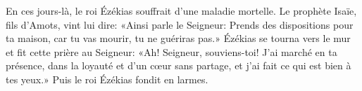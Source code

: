En ces jours-là, le roi Ézékias souffrait d’une maladie mortelle.
Le prophète Isaïe, fils d’Amots, vint lui dire:
	«Ainsi parle le Seigneur: Prends des dispositions pour ta maison,
	car tu vas mourir, tu ne guériras pas.»
Ézékias se tourna vers le mur et fit cette prière au Seigneur:
	«Ah! Seigneur, souviens-toi!
	J’ai marché en ta présence, dans la loyauté et d’un cœur sans partage,
	et j’ai fait ce qui est bien à tes yeux.»
Puis le roi Ézékias fondit en larmes.

